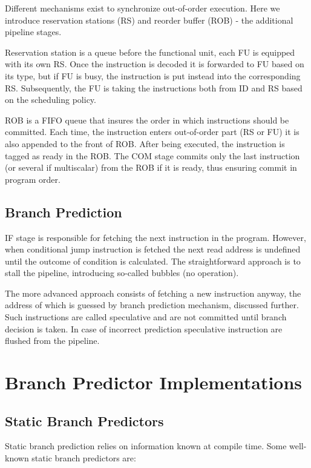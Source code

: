 Different mechanisms exist to synchronize out-of-order execution. Here we introduce reservation stations (RS) and reorder buffer (ROB) - the additional pipeline stages.

Reservation station is a queue before the functional unit, each FU is equipped with its own RS. Once the instruction is decoded it is forwarded to FU based on its type, but if FU is busy, the instruction is put instead into the corresponding RS. Subsequently, the FU is taking the instructions both from ID and RS based on the scheduling policy.

ROB is a FIFO queue that insures the order in which instructions should be committed. Each time, the instruction enters out-of-order part (RS or FU) it is also appended to the front of ROB. After being executed, the instruction is tagged as ready in the ROB. The COM stage commits only the last instruction (or several if multiscalar) from the ROB if it is ready, thus ensuring commit in program order.


\subsection{Branch Prediction}

IF stage is responsible for fetching the next instruction in the program. However, when conditional jump instruction is fetched the next read address is undefined until the outcome of condition is calculated. The straightforward approach is to stall the pipeline, introducing so-called bubbles (no operation).

The more advanced approach consists of fetching a new instruction anyway, the address of which is guessed by branch prediction mechanism, discussed further. Such instructions are called speculative and are not committed until branch decision is taken. In case of incorrect prediction speculative instruction are flushed from the pipeline. 

\section{Branch Predictor Implementations}

\subsection{Static Branch Predictors}

Static branch prediction relies on information known at compile time. Some well-known static branch predictors are:


